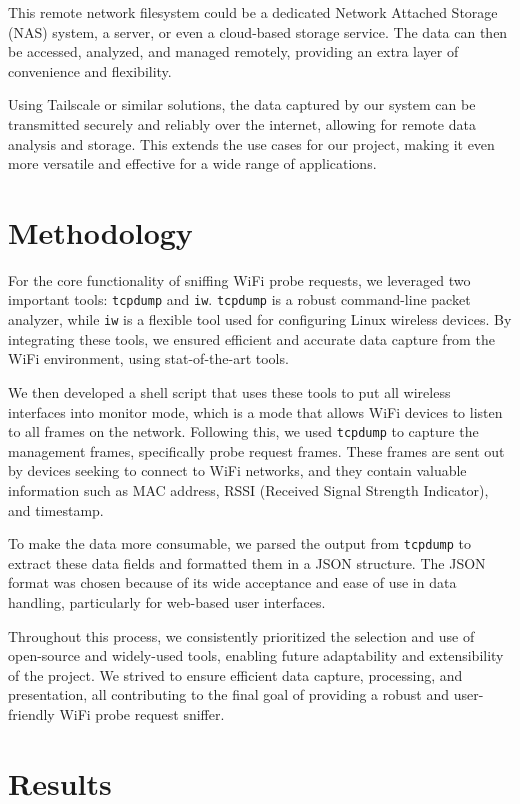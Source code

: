 \documentclass{article}
\begin{document}
This remote network filesystem could be a dedicated Network Attached Storage (NAS) system, a server, or even a cloud-based storage service. The data can then be accessed, analyzed, and managed remotely, providing an extra layer of convenience and flexibility.

Using Tailscale or similar solutions, the data captured by our system can be transmitted securely and reliably over the internet, allowing for remote data analysis and storage. This extends the use cases for our project, making it even more versatile and effective for a wide range of applications.

\section{Methodology}

For the core functionality of sniffing WiFi probe requests, we leveraged two important tools: \texttt{tcpdump} and \texttt{iw}. \texttt{tcpdump} is a robust command-line packet analyzer, while \texttt{iw} is a flexible tool used for configuring Linux wireless devices. By integrating these tools, we ensured efficient and accurate data capture from the WiFi environment, using stat-of-the-art tools.

We then developed a shell script that uses these tools to put all wireless interfaces into monitor mode, which is a mode that allows WiFi devices to listen to all frames on the network. Following this, we used \texttt{tcpdump} to capture the management frames, specifically probe request frames. These frames are sent out by devices seeking to connect to WiFi networks, and they contain valuable information such as MAC address, RSSI (Received Signal Strength Indicator), and timestamp. 

To make the data more consumable, we parsed the output from \texttt{tcpdump} to extract these data fields and formatted them in a JSON structure. The JSON format was chosen because of its wide acceptance and ease of use in data handling, particularly for web-based user interfaces. 

Throughout this process, we consistently prioritized the selection and use of open-source and widely-used tools, enabling future adaptability and extensibility of the project. We strived to ensure efficient data capture, processing, and presentation, all contributing to the final goal of providing a robust and user-friendly WiFi probe request sniffer.


\section{Results}
 
\end{document}
